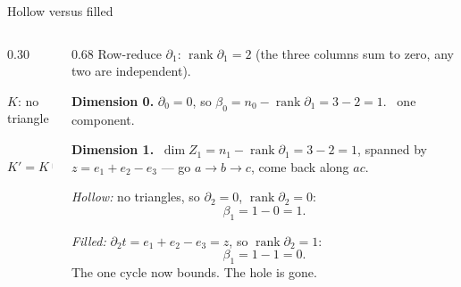 \documentclass[10pt,aspectratio=169]{beamer}
\newcommand{\rank}{\operatorname{rank}}
\begin{document}
    \begin{frame}{Hollow versus filled}
        \begin{columns}[T,onlytextwidth]
            \begin{column}{0.30\textwidth}
                \centering
                \\
                {\scriptsize $K$: no triangle}\\[1.0em]
                \\
                {\scriptsize $K'=K\cup\{t\}$}
            \end{column}
            \begin{column}{0.68\textwidth}
                \small
                Row-reduce $\partial_1$: $\rank\partial_1=2$ (the three columns sum to zero, any two
                are independent).

                \vspace{0.4em}
                \textbf{Dimension 0.} $\partial_0=0$, so
                $\beta_0 = n_0-\rank\partial_1 = 3-2 = 1$. \checkmark\ one component.

                \vspace{0.4em}
                \textbf{Dimension 1.} $\ \dim Z_1=n_1-\rank\partial_1=3-2=1$,
                spanned by $z=e_1+e_2-e_3$ --- go $a\to b\to c$, come back along $ac$.

                \vspace{0.5em}

                \emph{Hollow:} no triangles, so $\partial_2=0$, $\rank\partial_2=0$:
                \[ \beta_1 = 1-0 = \boxed{1}. \]

                \emph{Filled:} $\partial_2 t=e_1+e_2-e_3=z$, so $\rank\partial_2=1$:
                \[ \beta_1 = 1-1 = \boxed{0}. \]
                The one cycle now bounds. The hole is gone.
            \end{column}
        \end{columns}
    \end{frame}
\end{document}
